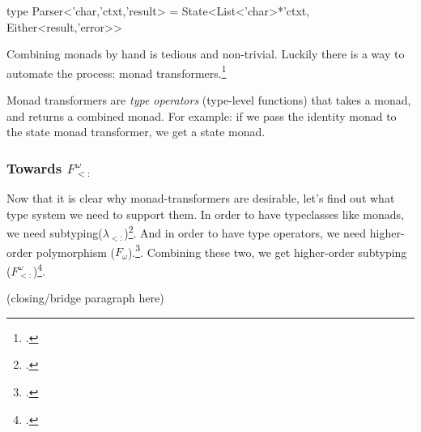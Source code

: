 \begin{multicols}{2}
  \begin{code}[language=Caml]
  type Parser<'char,'ctxt,'result> =
    State<List<'char>*'ctxt,
          Either<result,'error>>
  \end{code}

  \noindent
  Combining monads by hand is tedious and non-trivial.
  Luckily there is a way to automate the process: monad transformers.\footcite[Chapter~18]{Haskell}

  Monad transformers are \textit{type operators} (type-level functions) that takes a monad, and returns a combined monad.
  For example: if we pass the identity monad to the state monad transformer, we get a state monad.

  \subsubsection*{Towards $F^\omega_{<:}$}
  Now that it is clear why monad-transformers are desirable, let's find out what type system we need to support them.
  In order to have typeclasses like monads, we need subtyping($\lambda_{<:}$)\footcite[Chapter~15]{Pierce02}.
  And in order to have type operators, we need higher-order polymorphism ($F_\omega$).\footcite[Chapter~30]{Pierce02}.
  Combining these two, we get higher-order subtyping ($F^\omega_{<:}$)\footcite[Chapter~31]{Pierce02}.

  (closing/bridge paragraph here)
\end{multicols}
